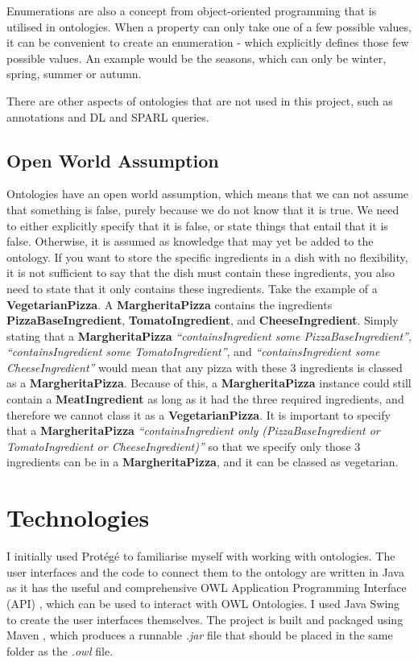 Enumerations are also a concept from object-oriented programming that is utilised in ontologies. When a property can only take one of a few possible values, it can be convenient to create an enumeration - which explicitly defines those few possible values. An example would be the seasons, which can only be winter, spring, summer or autumn.

There are other aspects of ontologies that are not used in this project, such as annotations and DL and SPARL queries.

\subsection{Open World Assumption}

Ontologies have an open world assumption, which means that we can not assume that something is false, purely because we do not know that it is true. We need to either explicitly specify that it is false, or state things that entail that it is false. Otherwise, it is assumed as knowledge that may yet be added to the ontology. If you want to store the specific ingredients in a dish with no flexibility, it is not sufficient to say that the dish must contain these ingredients, you also need to state that it only contains these ingredients. Take the example of a \textbf{VegetarianPizza}. A \textbf{MargheritaPizza} contains the ingredients \textbf{PizzaBaseIngredient}, \textbf{TomatoIngredient}, and \textbf{CheeseIngredient}. Simply stating that a \textbf{MargheritaPizza} \textit{``containsIngredient some PizzaBaseIngredient''}, \textit{``containsIngredient some TomatoIngredient''}, and \textit{``containsIngredient some CheeseIngredient''} would mean that any pizza with these 3 ingredients is classed as a \textbf{MargheritaPizza}. Because of this, a \textbf{MargheritaPizza} instance could still contain a \textbf{MeatIngredient} as long as it had the three required ingredients, and therefore we cannot class it as a \textbf{VegetarianPizza}. It is important to specify that a \textbf{MargheritaPizza} \textit{``containsIngredient only (PizzaBaseIngredient or TomatoIngredient or CheeseIngredient)''} so that we specify only those 3 ingredients can be in a \textbf{MargheritaPizza}, and it can be classed as vegetarian. 

\section{Technologies}

I initially used Protégé to familiarise myself with working with ontologies. The user interfaces and the code to connect them to the ontology are written in Java as it has the useful and comprehensive OWL Application Programming Interface (API) \cite{owl_api}, which can be used to interact with OWL Ontologies. I used Java Swing to create the user interfaces themselves. The project is built and packaged using Maven \cite{maven}, which produces a runnable \textit{.jar} file that should be placed in the same folder as the \textit{.owl} file.

